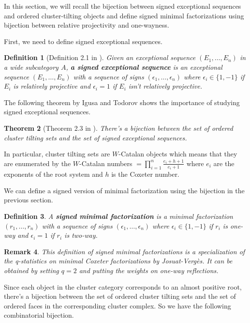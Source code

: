 \documentclass[11pt]{amsart}
\newtheorem{thm}{Theorem}[section]
\newtheorem{defi}[thm]{Definition}%
\newtheorem{rema}[thm]{Remark}%
\begin{document}
In this section, we will recall the bijection between signed exceptional sequences and ordered cluster-tilting objects and define signed minimal factorizations using bijection between relative projectivity and one-wayness.

First, we need to define signed exceptional sequences.

\begin{defi}[Definition 2.1 in \cite{igusa2017signed}]
    Given an exceptional sequence $(E_1,\dots,E_n)$ in a wide subcategory $A$, \textbf{a signed exceptional sequence} is an exceptional sequence $(E_1,\dots,E_n)$ with a sequence of signs $(\epsilon_1,\dots,\epsilon_n)$ where $\epsilon_i \in \{1,-1\}$ if $E_i$ is relatively projective and $\epsilon_i=1$ if $E_i$ isn't relatively projective.
\end{defi}

The following theorem by Igusa and Todorov shows the importance of studying signed exceptional sequences.

\begin{thm}[Theorem 2.3 in \cite{igusa2017signed}]
    There's a bijection between the set of ordered cluster tilting sets and the set of signed exceptional sequences.
\end{thm}

In particular, cluster tilting sets are $W$-Catalan objects which means that they are enumerated by the $W$-Catalan numbers $=\prod_{i=1}^n \frac{e_i+h+1}{e_i+1}$ where $e_i$ are the exponents of the root system and $h$ is the Coxeter number.

We can define a signed version of minimal factorization using the bijection in the previous section.

\begin{defi}
    A \textbf{signed minimal factorization} is a minimal factorization $(r_1,\dots,r_n)$ with a sequence of signs $(\epsilon_1,\dots,\epsilon_n)$ where $\epsilon_i \in \{1,-1\}$ if $r_i$ is one-way and $\epsilon_i=1$ if $r_i$ is two-way.
\end{defi}

\begin{rema}
    This definition of signed minimal factorizations is a specialization of the q-statistics on minimal Coxeter factorizations by Josuat-Verg\`es. It can be obtained by setting $q=2$ and putting the weights on one-way reflections.
\end{rema}

Since each object in the cluster category corresponds to an almost positive root, there's a bijection between the set of ordered cluster tilting sets and the set of ordered faces in the corresponding cluster complex. So we have the following combinatorial bijection.
\end{document}

